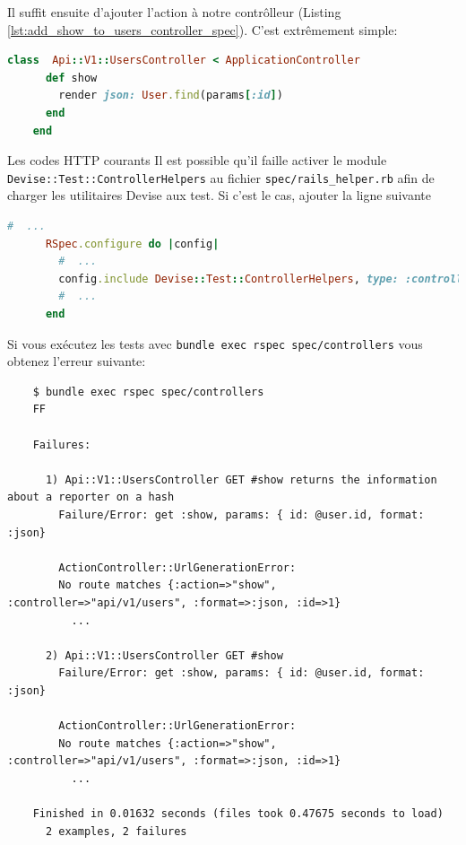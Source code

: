\documentclass[]{report}
\begin{document}
    Il suffit ensuite d'ajouter l'action à notre contrôlleur (Listing \ref{lst:add_show_to_users_controller_spec}). C'est extrêmement simple:

    \begin{scriptsize}
    \begin{lstlisting}[language=ruby, caption={Le contrôlleur des utilisateurs avec l'action' 'show' (app/controllers/api/v1/users\_controller.rb)}, label={lst:add_show_to_users_controller_spec}]
    class  Api::V1::UsersController < ApplicationController
      def show
        render json: User.find(params[:id])
      end
    end
    \end{lstlisting}
    \end{scriptsize}

    \begin{tcolorbox}{Les codes HTTP courants}
      Il est possible qu'il faille activer le module \verb|Devise::Test::ControllerHelpers| au fichier \verb|spec/rails_helper.rb| afin de charger les utilitaires Devise aux test. Si c'est le cas, ajouter la ligne suivante

      \begin{scriptsize}
      \begin{lstlisting}[language=ruby]
      #  ...
      RSpec.configure do |config|
        #  ...
        config.include Devise::Test::ControllerHelpers, type: :controller
        #  ...
      end
      \end{lstlisting}
      \end{scriptsize}
    \end{tcolorbox}

    Si vous exécutez les tests avec \verb|bundle exec rspec spec/controllers| vous obtenez l'erreur suivante:

    \begin{scriptsize}
    \begin{lstlisting}
    $ bundle exec rspec spec/controllers
    FF

    Failures:

      1) Api::V1::UsersController GET #show returns the information about a reporter on a hash
        Failure/Error: get :show, params: { id: @user.id, format: :json}

        ActionController::UrlGenerationError:
        No route matches {:action=>"show", :controller=>"api/v1/users", :format=>:json, :id=>1}
          ...

      2) Api::V1::UsersController GET #show
        Failure/Error: get :show, params: { id: @user.id, format: :json}

        ActionController::UrlGenerationError:
        No route matches {:action=>"show", :controller=>"api/v1/users", :format=>:json, :id=>1}
          ...

    Finished in 0.01632 seconds (files took 0.47675 seconds to load)
      2 examples, 2 failures
    \end{lstlisting}
    \end{scriptsize}
\end{document}
